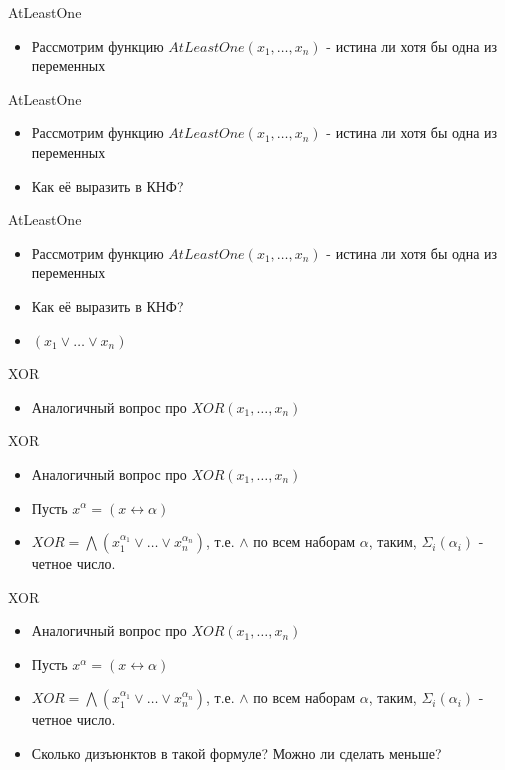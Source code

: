 \documentclass{beamer}
\begin{document}
\begin{frame}{AtLeastOne}
\begin{itemize}
\item Рассмотрим функцию $AtLeastOne(x_1, \dots, x_n)$ - истина ли хотя бы одна из переменных
\end{itemize}
\end{frame}

\begin{frame}{AtLeastOne}
\begin{itemize}
\item Рассмотрим функцию $AtLeastOne(x_1, \dots, x_n)$ - истина ли хотя бы одна из переменных
\item Как её выразить в КНФ?
\end{itemize}
\end{frame}

\begin{frame}{AtLeastOne}
\begin{itemize}
\item Рассмотрим функцию $AtLeastOne(x_1, \dots, x_n)$ - истина ли хотя бы одна из переменных
\item Как её выразить в КНФ?
\item $(x_1 \vee \dots \vee x_n)$
\end{itemize}
\end{frame}

\begin{frame}{XOR}
\begin{itemize}
\item Аналогичный вопрос про $XOR(x_1, \dots, x_n)$
\end{itemize}
\end{frame}

\begin{frame}{XOR}
\begin{itemize}
\item Аналогичный вопрос про $XOR(x_1, \dots, x_n)$
\item Пусть $x^{\alpha} = (x \leftrightarrow \alpha)$
\item $XOR = \bigwedge(x_1^{\alpha_1} \vee \dots \vee x_n^{\alpha_n})$, т.е. $\wedge$ по всем наборам $\alpha$, таким,
$\Sigma_i(\alpha_i)$ - четное число.
\end{itemize}
\end{frame}

\begin{frame}{XOR}
\begin{itemize}
\item Аналогичный вопрос про $XOR(x_1, \dots, x_n)$
\item Пусть $x^{\alpha} = (x \leftrightarrow \alpha)$
\item $XOR = \bigwedge(x_1^{\alpha_1} \vee \dots \vee x_n^{\alpha_n})$, т.е. $\wedge$ по всем наборам $\alpha$, таким,
$\Sigma_i(\alpha_i)$ - четное число.
\item Сколько дизъюнктов в такой формуле? Можно ли сделать меньше?
\end{itemize}
\end{frame}
\end{document}
